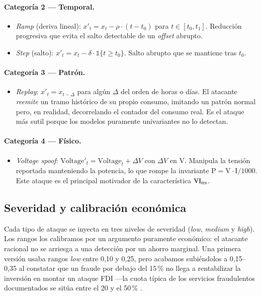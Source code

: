\paragraph{Categoría 2 --- Temporal.}

\begin{itemize}[leftmargin=*,topsep=0pt]
  \item \emph{Ramp} (deriva lineal): $x'_t = x_t - \rho \cdot (t - t_0)$ para $t \in [t_0, t_1]$. Reducción progresiva que evita el salto detectable de un \textit{offset} abrupto.
  \item \emph{Step} (salto): $x'_t = x_t - \delta \cdot \mathbb{1}\{t \geq t_0\}$. Salto abrupto que se mantiene tras $t_0$.
\end{itemize}

\paragraph{Categoría 3 --- Patrón.}

\begin{itemize}[leftmargin=*,topsep=0pt]
  \item \emph{Replay}: $x'_t = x_{t - \Delta}$ para algún $\Delta$ del orden de horas o días. El atacante \emph{reemite} un tramo histórico de su propio consumo, imitando un patrón normal pero, en realidad, decorrelando el contador del consumo real. Es el ataque más sutil porque los modelos puramente univariantes no lo detectan.
\end{itemize}

\paragraph{Categoría 4 --- Físico.}

\begin{itemize}[leftmargin=*,topsep=0pt]
  \item \emph{Voltage spoof}: $\mathrm{Voltage}'_t = \mathrm{Voltage}_t + \Delta V$ con $\Delta V$ en \si{\volt}. Manipula la tensión reportada manteniendo la potencia, lo que rompe la invariante $\mathrm{P}=\mathrm{V}\cdot\mathrm{I}/1000$. Este ataque es el principal motivador de la característica $\mathrm{VI}_{\text{res}}$.
\end{itemize}

\subsection{Severidad y calibración económica}

Cada tipo de ataque se inyecta en tres niveles de severidad (\emph{low}, \emph{medium} y \emph{high}). Los rangos los calibramos por un argumento puramente económico: el atacante racional no se arriesga a una detección por un ahorro marginal. Una primera versión usaba rangos \emph{low} entre 0{,}10 y 0{,}25, pero acabamos subiéndolos a 0{,}15--0{,}35 al constatar que un fraude por debajo del 15\,\% no llega a rentabilizar la inversión en montar un ataque FDI ---la cuota típica de los servicios fraudulentos documentados se sitúa entre el 20 y el 50\,\% \cite{messinis2018review,jokar2016electricity}.

